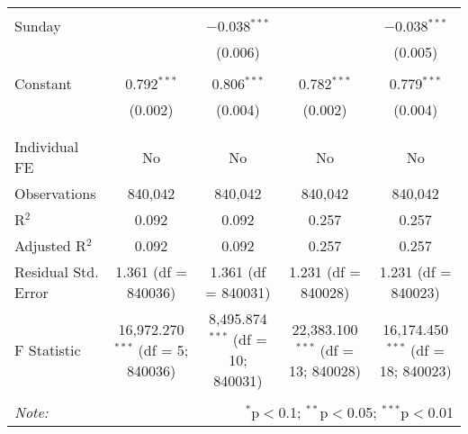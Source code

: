 \documentclass[
]{article}
\begin{document}
\begin{table}[!htbp]
{\begin{tabular}{@{\extracolsep{5pt}}lcccc}
  & & & & \\ 
 Sunday &  & $-$0.038$^{***}$ &  & $-$0.038$^{***}$ \\ 
  &  & (0.006) &  & (0.005) \\ 
  & & & & \\ 
 Constant & 0.792$^{***}$ & 0.806$^{***}$ & 0.782$^{***}$ & 0.779$^{***}$ \\ 
  & (0.002) & (0.004) & (0.002) & (0.004) \\ 
  & & & & \\ 
\hline \\[-1.8ex] 
Individual FE & No & No & No & No \\ 
Observations & 840,042 & 840,042 & 840,042 & 840,042 \\ 
R$^{2}$ & 0.092 & 0.092 & 0.257 & 0.257 \\ 
Adjusted R$^{2}$ & 0.092 & 0.092 & 0.257 & 0.257 \\ 
Residual Std. Error & 1.361 (df = 840036) & 1.361 (df = 840031) & 1.231 (df = 840028) & 1.231 (df = 840023) \\ 
F Statistic & 16,972.270$^{***}$ (df = 5; 840036) & 8,495.874$^{***}$ (df = 10; 840031) & 22,383.100$^{***}$ (df = 13; 840028) & 16,174.450$^{***}$ (df = 18; 840023) \\ 
\hline 
\hline \\[-1.8ex] 
\textit{Note:}  & \multicolumn{4}{r}{$^{*}$p$<$0.1; $^{**}$p$<$0.05; $^{***}$p$<$0.01} \\ 
\end{tabular}
} 
\end{table} 
\newpage
\end{document}

